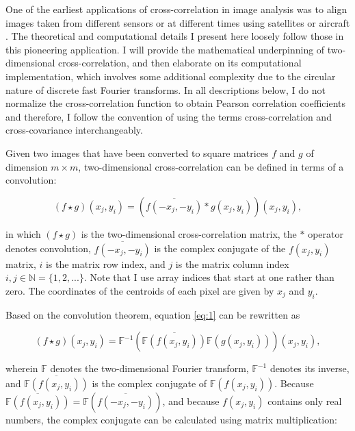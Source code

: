 One of the earliest applications of cross-correlation in image analysis
was to align images taken from different sensors or at different times
using satellites or aircraft \citep{Anuta1970}. The theoretical and
computational details I present here loosely follow those in this
pioneering application. I will provide the mathematical underpinning of
two-dimensional cross-correlation, and then elaborate on its
computational implementation, which involves some additional complexity
due to the circular nature of discrete fast Fourier transforms. In all
descriptions below, I do not normalize the cross-correlation function to
obtain Pearson correlation coefficients and therefore, I follow the
convention of using the terms cross-correlation and cross-covariance
interchangeably.

Given two images that have been converted to square matrices \(f\) and
\(g\) of dimension \(m \times m\), two-dimensional cross-correlation can
be defined in terms of a convolution:

\begin{equation}
\left(f \star g\right)\left(x_j, y_i\right)  =  \left(\overline{f\left(-x_j, -y_i\right)} * g\left(x_j, y_i\right)\right)\left(x_j, y_i\right),
\label{eq:1}
\end{equation}

\noindent in which \(\left(f \star g\right)\) is the two-dimensional
cross-correlation matrix, the \(*\) operator denotes convolution,
\(\overline{f\left(-x_j, -y_i\right)}\) is the complex conjugate of the
\(f\left(x_j, y_i\right)\) matrix, \(i\) is the matrix row index, and
\(j\) is the matrix column index
\(i, j \in \mathbb{N} = \{1, 2, . . .\}\). Note that I use array indices
that start at one rather than zero. The coordinates of the centroids of
each pixel are given by \(x_j\) and \(y_i\).

Based on the convolution theorem, equation \eqref{eq:1} can be rewritten
as

\begin{equation}
\left(f \star g\right)\left(x_j, y_i\right)  = \mathbb{F}^{-1}\left(\overline{\mathbb{F}\left(f\left(x_j, y_i\right)\right)}\mathbb{F}\left(g\left(x_j, y_i\right)\right)\right)\left(x_j, y_i\right), 
\label{eq:2}
\end{equation}

\noindent wherein \(\mathbb{F}\) denotes the two-dimensional Fourier
transform, \(\mathbb{F}^{-1}\) denotes its inverse, and
\(\overline{\mathbb{F}\left(f\left(x_j, y_i\right)\right)}\) is the
complex conjugate of \(\mathbb{F}\left(f\left(x_j, y_i\right)\right)\).
Because
\(\overline{\mathbb{F}\left(f\left(x_j, y_i\right)\right)} = \mathbb{F}\left(\overline{f\left(-x_j, -y_i\right)}\right)\),
and because \(f\left(x_j, y_i\right)\) contains only real numbers, the
complex conjugate can be calculated using matrix multiplication:

